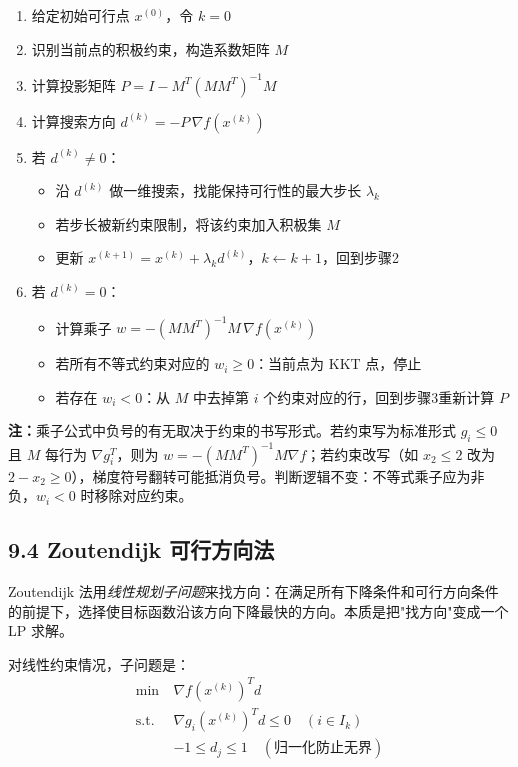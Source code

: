 \begin{enumerate}
  \item 给定初始可行点 $x^{(0)}$，令 $k=0$
  \item 识别当前点的积极约束，构造系数矩阵 $M$
  \item 计算投影矩阵 $P = I - M^T(MM^T)^{-1}M$
  \item 计算搜索方向 $d^{(k)} = -P\,\nabla f(x^{(k)})$
  \item 若 $d^{(k)} \neq 0$：
    \begin{itemize}
      \item 沿 $d^{(k)}$ 做一维搜索，找能保持可行性的最大步长 $\lambda_k$
      \item 若步长被新约束限制，将该约束加入积极集 $M$
      \item 更新 $x^{(k+1)} = x^{(k)} + \lambda_k d^{(k)}$，$k \leftarrow k+1$，回到步骤2
    \end{itemize}
  \item 若 $d^{(k)} = 0$：
    \begin{itemize}
      \item 计算乘子 $w = -(MM^T)^{-1}M\,\nabla f(x^{(k)})$
      \item 若所有不等式约束对应的 $w_i \ge 0$：当前点为 KKT 点，停止
      \item 若存在 $w_i < 0$：从 $M$ 中去掉第 $i$ 个约束对应的行，回到步骤3重新计算 $P$
    \end{itemize}
\end{enumerate}

\textbf{注：}乘子公式中负号的有无取决于约束的书写形式。若约束写为标准形式 $g_i \le 0$ 且 $M$ 每行为 $\nabla g_i^T$，则为 $w = -(MM^T)^{-1}M\nabla f$；若约束改写（如 $x_2 \le 2$ 改为 $2-x_2 \ge 0$），梯度符号翻转可能抵消负号。判断逻辑不变：不等式乘子应为非负，$w_i < 0$ 时移除对应约束。

\subsection{9.4 Zoutendijk 可行方向法}

Zoutendijk 法用\emph{线性规划子问题}来找方向：在满足所有下降条件和可行方向条件的前提下，选择使目标函数沿该方向下降最快的方向。本质是把"找方向"变成一个 LP 求解。

对线性约束情况，子问题是：
\[
\begin{aligned}
\min\ & \nabla f(x^{(k)})^T d \\
\text{s.t.}\ & \nabla g_i(x^{(k)})^T d \le 0 \quad (i \in I_k) \\
& -1 \le d_j \le 1 \quad (\text{归一化防止无界})
\end{aligned}
\]

